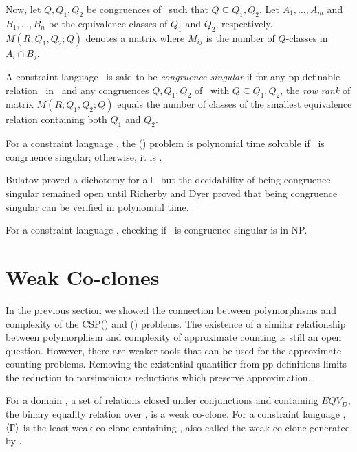 Now, let \(Q,Q_1,Q_2\) be congruences of \mR\ such that
\(Q\subseteq Q_1,Q_2\). Let \(A_1,\dotsc,A_m\) and \(B_1,\dotsc,B_n\) be
the equivalence classes of \(Q_1\) and \(Q_2\), respectively. 
\(M(R;Q_1,Q_2;Q)\) denotes a matrix where \(M_{ij}\) is the number of \(Q\)-classes in
\(A_i\cap B_j\). 

A constraint language \mrelset\ is said to be \emph{congruence
 singular} if for any pp-definable relation \mR\ in \mrelset\ and any congruences
\(Q,Q_1,Q_2\) of \mR\ with \(Q\subseteq Q_1,Q_2\), the
\emph{row rank} of  matrix \(M(R;Q_1,Q_2;Q)\) equals
the number of classes of the smallest equivalence relation containing
both \(Q_1\) and \(Q_2\)\@. 

\begin{theorem}
For a constraint language \mrelset,
the \ccsp(\mrelset) problem is polynomial time solvable if 
\mrelset\ is congruence singular; otherwise, it is \cpc\@.
\end{theorem}

Bulatov proved a dichotomy for all \mrelset\ but the decidability of being congruence
singular remained open until Richerby and Dyer \cite{DyerR10} 
proved that being congruence singular can be verified in polynomial time.

\begin{theorem} 
For a constraint language \mrelset, checking if \mrelset\ is congruence singular is in NP.
\end{theorem}

\section{Weak Co-clones}
In the previous section we showed the connection between polymorphisms and complexity 
of the CSP(\mrelset) and \ccsp(\mrelset) problems. The existence of a similar relationship
between polymorphism and complexity of approximate counting is still an open
question. However, there are weaker tools that can be used for the approximate counting
problems. Removing the existential quantifier from pp-definitions limits the 
reduction to parsimonious reductions which preserve approximation.


For a domain \mD, a set of relations closed under conjunctions and
containing \(EQV_D\), the binary equality relation over \mD,
is a weak co-clone. For a constraint language \mrelset, 
\(\langle \Gamma \rangle\) is the least weak co-clone containing \mrelset,
also called the weak co-clone generated by \mrelset\@.

